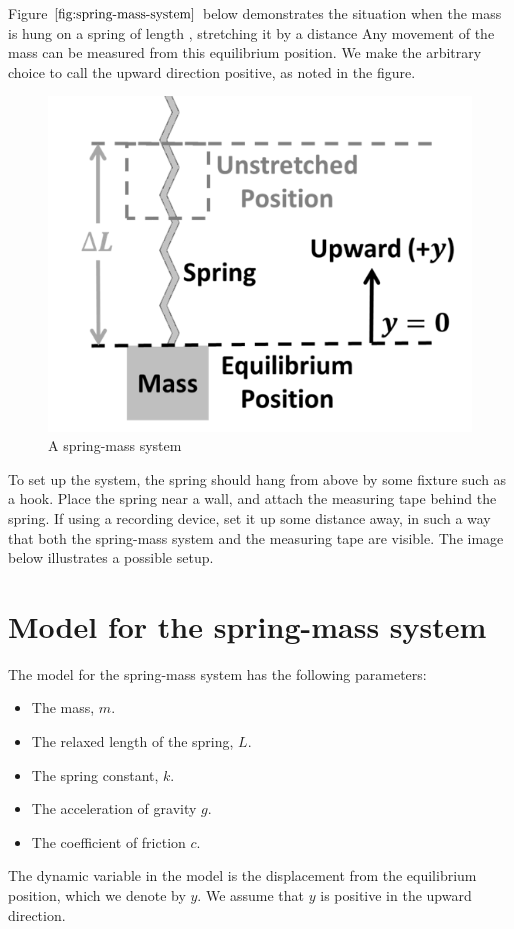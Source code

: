 \documentclass{ximera}
\begin{document}
Figure $\ref{fig:spring-mass-system}$ below demonstrates the situation when the mass is hung on a spring of length , stretching it by a distance   Any movement of the mass can be measured from this equilibrium position.  We make the arbitrary choice to call the upward direction positive, as noted in the figure.  

\begin{figure}
    \centering
    \begin{image}
    \includegraphics[scale=0.5]{spring-mass.png}
    \end{image}
    \caption{A spring-mass system}
    \label{fig:spring-mass-system}
\end{figure}

To set up the system, the spring should hang from above by some fixture such as a hook. Place the spring near a wall, and attach the measuring tape behind the spring. If using a recording device, set it up some distance away, in such a way that both the spring-mass system and the measuring tape are visible. The image below illustrates a possible setup.

\section{Model for the spring-mass system}

The model for the spring-mass system has the following parameters:
\begin{itemize}
    \item The mass, $m$.
    \item The relaxed length of the spring, $L$.
    \item The spring constant, $k$.
    \item The acceleration of gravity $g$.
    \item The coefficient of friction $c$.
\end{itemize}
The dynamic variable in the model is the displacement from the equilibrium position, which we denote by $y$. We assume that $y$ is positive in the upward direction.
\end{document}
